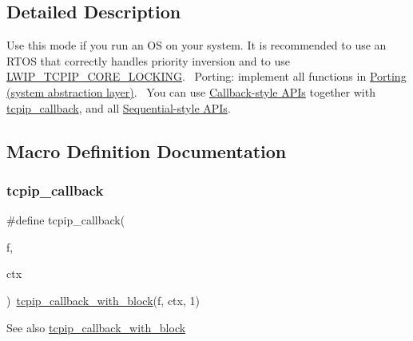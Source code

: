 \subsection{Detailed Description}
Use this mode if you run an OS on your system. It is recommended to use an R\+T\+OS that correctly handles priority inversion and to use \hyperlink{group__lwip__opts__lock_ga8e46232794349c209e8ed4e9e7e4f011}{L\+W\+I\+P\+\_\+\+T\+C\+P\+I\+P\+\_\+\+C\+O\+R\+E\+\_\+\+L\+O\+C\+K\+I\+NG}.~\newline
Porting\+: implement all functions in \hyperlink{group__sys__layer}{Porting (system abstraction layer)}.~\newline
You can use \hyperlink{group__callbackstyle__api}{Callback-\/style A\+P\+Is} together with \hyperlink{group__lwip__os_ga7eb868a1215472ec38f3f2a04d442b9f}{tcpip\+\_\+callback}, and all \hyperlink{group__sequential__api}{Sequential-\/style A\+P\+Is}. 

\subsection{Macro Definition Documentation}
\mbox{\label{group__lwip__os_ga7eb868a1215472ec38f3f2a04d442b9f}} 
\subsubsection{\texorpdfstring{tcpip\+\_\+callback}{tcpip\_callback}\hspace{0.1cm}{\footnotesize\ttfamily [1/2]}}
{\footnotesize\ttfamily \#define tcpip\+\_\+callback(\begin{DoxyParamCaption}\item[{}]{f,  }\item[{}]{ctx }\end{DoxyParamCaption})~\hyperlink{openmote-cc2538_2lwip_2src_2include_2lwip_2tcpip_8h_ab1d3ef23817d7703fa75ed67bd45ea1d}{tcpip\+\_\+callback\+\_\+with\+\_\+block}(f, ctx, 1)}

\begin{DoxySeeAlso}{See also}
\hyperlink{native_2lwip_2src_2include_2lwip_2tcpip_8h_ab1d3ef23817d7703fa75ed67bd45ea1d}{tcpip\+\_\+callback\+\_\+with\+\_\+block} 
\end{DoxySeeAlso}
\mbox{\label{group__lwip__os_ga7eb868a1215472ec38f3f2a04d442b9f}} 

